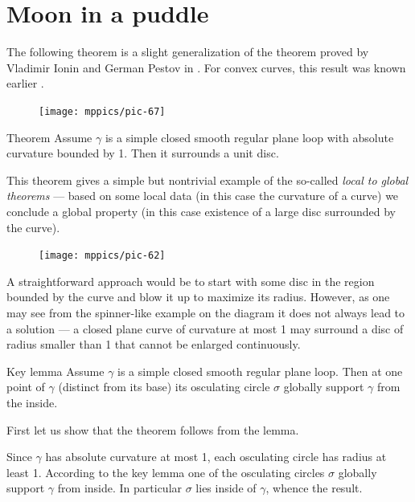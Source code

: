 \section{Moon in a puddle}

The following theorem is a slight generalization of the theorem proved by Vladimir Ionin and German Pestov in \cite{ionin-pestov}.
For convex curves, this result was known earlier \cite[\S 24]{blaschke}.


\begin{figure}
\vskip-6mm
\centering
\texttt{[image: mppics/pic-67]}
\vskip0mm
\end{figure}

\begin{thm}{Theorem}\label{thm:moon-orginal}
Assume $\gamma$ is a simple closed smooth regular plane loop with absolute curvature bounded by 1.
Then it surrounds a unit disc.
\end{thm}

This theorem gives a simple but nontrivial example of the so-called \emph{local to global theorems} --- based on some local data (in this case the curvature of a curve) we conclude a global property (in this case existence of a large disc surrounded by the curve).

{

\begin{figure}
\vskip-4mm
\centering
\texttt{[image: mppics/pic-62]}
\vskip0mm
\end{figure}

A straightforward approach would be to start with some disc in the region bounded by the curve and blow it up to maximize its radius.
However, as one may see from the spinner-like example on the diagram it does not always lead to a solution --- a closed plane curve of curvature at most 1 may surround a disc of radius smaller than 1 that cannot be enlarged continuously.

}

\begin{thm}{Key lemma}\label{thm:moon}
Assume $\gamma$ is a simple closed smooth regular plane loop.
Then at one point of $\gamma$ (distinct from its base) its osculating circle $\sigma$ globally support $\gamma$ from the inside.
\end{thm}

First let us show that the theorem follows from the lemma.

Since $\gamma$ has absolute curvature at most 1, each osculating circle has radius at least 1.
According to the key lemma one of the osculating circles $\sigma$ globally support $\gamma$ from inside.
In particular $\sigma$ lies inside of $\gamma$, whence the result.
\qeds

